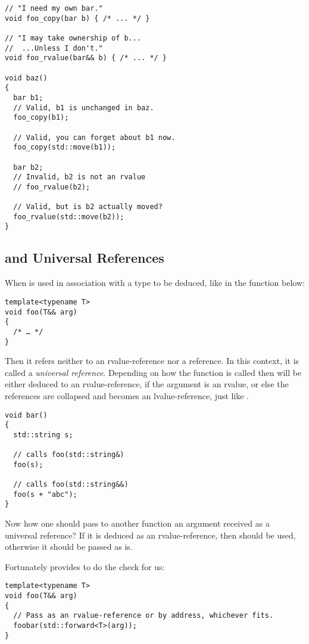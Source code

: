 \begin{lstlisting}
// "I need my own bar."
void foo_copy(bar b) { /* ... */ }

// "I may take ownership of b...
//  ...Unless I don't."
void foo_rvalue(bar&& b) { /* ... */ }

void baz()
{
  bar b1;
  // Valid, b1 is unchanged in baz.
  foo_copy(b1);

  // Valid, you can forget about b1 now.
  foo_copy(std::move(b1));

  bar b2;
  // Invalid, b2 is not an rvalue
  // foo_rvalue(b2);

  // Valid, but is b2 actually moved?
  foo_rvalue(std::move(b2));
}
\end{lstlisting}

\subsection{ and Universal References}

When \code{\&\&} is used in association with a type to be deduced,
like in the function below:

\begin{lstlisting}
template<typename T>
void foo(T&& arg)
{
  /* … */
}
\end{lstlisting}

Then it refers neither to an rvalue-reference nor a reference. In this
context, it is called a \emph{universal reference}. Depending on how
the function is called then  will be either deduced to an
rvalue-reference, if the argument is an rvalue, or else the references
are collapsed and  becomes an lvalue-reference, just like
.

\begin{lstlisting}
void bar()
{
  std::string s;

  // calls foo(std::string&)
  foo(s);

  // calls foo(std::string&&)
  foo(s + "abc");
}
\end{lstlisting}

Now how one should pass to another function an argument received as a
universal reference? If it is deduced as an rvalue-reference, then
 should be used, otherwise it should be passed as
is.

Fortunately  provides  to do the check for
us:

\begin{lstlisting}
template<typename T>
void foo(T&& arg)
{
  // Pass as an rvalue-reference or by address, whichever fits.
  foobar(std::forward<T>(arg));
}
\end{lstlisting}
